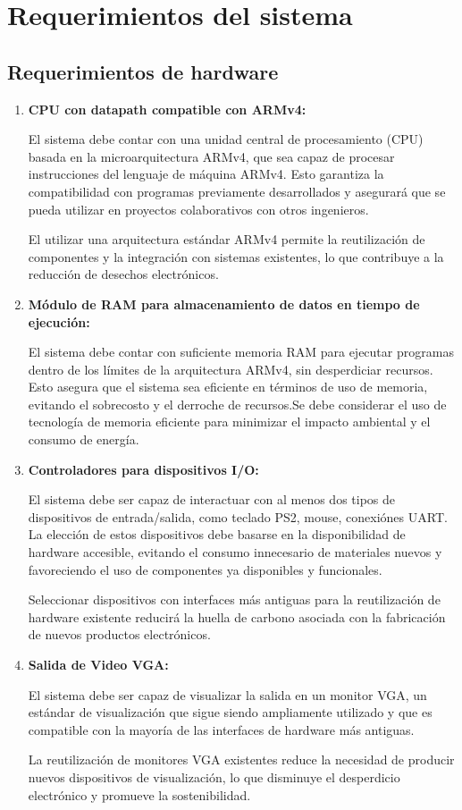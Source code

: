 \documentclass[conference]{IEEEtran}
\begin{document}
\section{Requerimientos del sistema}
\subsection{Requerimientos de hardware}
\begin{enumerate}
	\item \textbf{CPU con datapath compatible con ARMv4:}
	\par El sistema debe contar con una unidad central de procesamiento (CPU) basada en la microarquitectura ARMv4, que sea capaz de procesar instrucciones del lenguaje de máquina ARMv4. Esto garantiza la compatibilidad con programas previamente desarrollados y asegurará que se pueda utilizar en proyectos colaborativos con otros ingenieros.
	\par El utilizar una arquitectura estándar ARMv4 permite la reutilización de componentes y la integración con sistemas existentes, lo que contribuye a la reducción de desechos electrónicos.
	
	\item \textbf{Módulo de RAM para almacenamiento de datos en tiempo de ejecución:}
	\par  El sistema debe contar con suficiente memoria RAM para ejecutar programas dentro de los límites de la arquitectura ARMv4, sin desperdiciar recursos. Esto asegura que el sistema sea eficiente en términos de uso de memoria, evitando el sobrecosto y el derroche de recursos.Se debe considerar el uso de tecnología de memoria eficiente para minimizar el impacto ambiental y el consumo de energía.
	
	\item \textbf{Controladores para dispositivos I/O:}
	\par El sistema debe ser capaz de interactuar con al menos dos tipos de dispositivos de entrada/salida, como teclado PS2, mouse, conexiónes UART. La elección de estos dispositivos debe basarse en la disponibilidad de hardware accesible, evitando el consumo innecesario de materiales nuevos y favoreciendo el uso de componentes ya disponibles y funcionales.
	
	\par Seleccionar dispositivos con interfaces más antiguas para la reutilización de hardware existente reducirá la huella de carbono asociada con la fabricación de nuevos productos electrónicos.
	
	\item \textbf{Salida de Video VGA:}
	\par El sistema debe ser capaz de visualizar la salida en un monitor VGA, un estándar de visualización que sigue siendo ampliamente utilizado y que es compatible con la mayoría de las interfaces de hardware más antiguas.
	
	\par La reutilización de monitores VGA existentes reduce la necesidad de producir nuevos dispositivos de visualización, lo que disminuye el desperdicio electrónico y promueve la sostenibilidad.
	
\end{enumerate}
\end{document}
